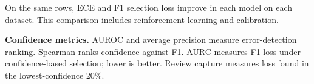 \par\smallskip\par\smallskip
{} On the same rows, ECE and F1 selection loss improve in each model on each dataset. This comparison includes reinforcement learning and calibration.
\par\par
{\fontsize{8.5}{9.5}\selectfont\textbf{Confidence metrics.} AUROC and average precision measure error-detection ranking. Spearman ranks confidence against F1. AURC measures F1 loss under confidence-based selection; lower is better. Review capture measures loss found in the lowest-confidence 20\%.}\par
\endgroup
